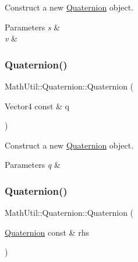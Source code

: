 Construct a new \hyperlink{structMathUtil_1_1Quaternion}{Quaternion} object. 


\begin{DoxyParams}{Parameters}
{\em s} & \\
\hline
{\em v} & \\
\hline
\end{DoxyParams}
\mbox{\label{structMathUtil_1_1Quaternion_a37216d9a4beb2dbe5a077aeba11bfca2}} 
\subsubsection{\texorpdfstring{Quaternion()}{Quaternion()}\hspace{0.1cm}{\footnotesize\ttfamily [3/4]}}
{\footnotesize\ttfamily Math\+Util\+::\+Quaternion\+::\+Quaternion (\begin{DoxyParamCaption}\item[{Vector4 const \&}]{q }\end{DoxyParamCaption})\hspace{0.3cm}{\ttfamily [inline]}}



Construct a new \hyperlink{structMathUtil_1_1Quaternion}{Quaternion} object. 


\begin{DoxyParams}{Parameters}
{\em q} & \\
\hline
\end{DoxyParams}
\mbox{\label{structMathUtil_1_1Quaternion_ab8a51bd860dc7c4d007aa0b87861c948}} 
\subsubsection{\texorpdfstring{Quaternion()}{Quaternion()}\hspace{0.1cm}{\footnotesize\ttfamily [4/4]}}
{\footnotesize\ttfamily Math\+Util\+::\+Quaternion\+::\+Quaternion (\begin{DoxyParamCaption}\item[{\hyperlink{structMathUtil_1_1Quaternion}{Quaternion} const \&}]{rhs }\end{DoxyParamCaption})\hspace{0.3cm}{\ttfamily [inline]}}



